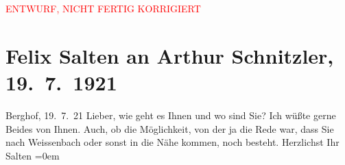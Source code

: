 
\begin{center}
            \textcolor{red}{ENTWURF, NICHT FERTIG KORRIGIERT}
                      \end{center}
            
         
         \renewcommand{\erwaehntePersonen}{Personen: Frieda Pollak}
         \renewcommand{\erwaehnteOrte}{Orte: Berghof, Unterach am Attersee, Weißenbach am Attersee, Wien}
         \renewcommand{\erwaehnteWerke}{}
               \section[Felix Salten an Arthur Schnitzler, 19. 7. 1921]{ Felix Salten an Arthur Schnitzler, 19. 7. 1921}\nopagebreak{}\rehead{ }\begin{ledgroupsized}[t]{13cm}\normalsize\beginnumbering \toendnotes[C]{\smallbreak\pagebreak[2]} 
\pstart
           \raggedleft{}{\pb}Berghof, 19. 7. 21\pend
           \pstart{}Lieber,\pend\pstart
           wie geht es Ihnen und wo sind Sie? Ich wüßte gerne Beides von Ihnen. Auch, ob die
               Möglichkeit, von der ja die Rede war, dass Sie nach Weissenbach oder sonst in die Nähe kommen, noch besteht. \pend
           \pstart
           Herzlichst Ihr {\\[\baselineskip]}\spacefill\mbox{Salten}\pend
           \leftskip=0em{}
         
         \endnumbering{}\end{ledgroupsized}\begin{anhang}\end{anhang}\newcommand{\dateiname}{L03572}\newcommand{\titel}{Felix Salten an Arthur Schnitzler, 19. 7. 1921}\newcommand{\editorInnen}{Martin Anton Müller und Laura Untner}
      
